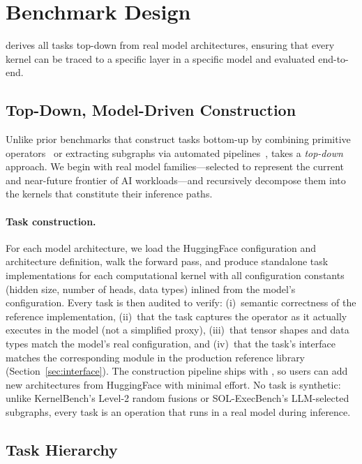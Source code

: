\section{Benchmark Design}
\label{sec:benchmark}

\fastkernels{} derives all tasks top-down from real model architectures, ensuring that every kernel can be traced to a specific layer in a specific model and evaluated end-to-end.

\subsection{Top-Down, Model-Driven Construction}
\label{sec:construction}

Unlike prior benchmarks that construct tasks bottom-up by combining primitive operators~\citep{kernelbench} or extracting subgraphs via automated pipelines~\citep{solexecbench}, \fastkernels{} takes a \emph{top-down} approach.
We begin with real model families---selected to represent the current and near-future frontier of AI workloads---and recursively decompose them into the kernels that constitute their inference paths.

\paragraph{Task construction.}
For each model architecture, we load the HuggingFace configuration and architecture definition, walk the forward pass, and produce standalone task implementations for each computational kernel with all configuration constants (hidden size, number of heads, data types) inlined from the model's configuration.
Every task is then audited to verify: (i)~semantic correctness of the reference implementation, (ii)~that the task captures the operator as it actually executes in the model (not a simplified proxy), (iii)~that tensor shapes and data types match the model's real configuration, and (iv)~that the task's interface matches the corresponding module in the production reference library (Section~\ref{sec:interface}).
The construction pipeline ships with \fastkernels{}, so users can add new architectures from HuggingFace with minimal effort.
No task is synthetic: unlike KernelBench's Level-2 random fusions or SOL-ExecBench's LLM-selected subgraphs, every task is an operation that runs in a real model during inference.

\subsection{Task Hierarchy}
\label{sec:hierarchy}

